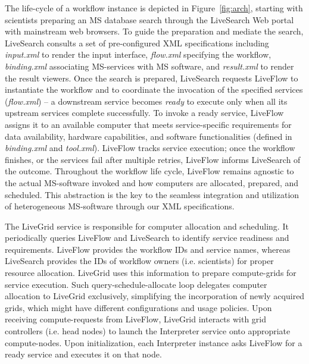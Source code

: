 \documentclass[arial,11pt]{article}
\newcommand{\SF}[1]{\textsf{#1}}
\newcommand{\LiveSearch}[0]{\SF{LiveSearch}\xspace}
\newcommand{\LiveFlow}[0]{\SF{LiveFlow}\xspace}
\newcommand{\LiveGrid}[0]{\SF{LiveGrid}\xspace}
\newcommand{\Interpreter}[0]{\SF{Interpreter}\xspace}
\begin{document}
The life-cycle of a workflow instance is depicted in Figure~\ref{fig:arch}, starting with scientists preparing an MS database search through the \LiveSearch Web portal with mainstream web browsers.
To guide the preparation and mediate the search, \LiveSearch consults a set of pre-configured XML specifications including
  {\em  input.xml} to render the input interface,
  {\em  flow.xml} specifying the workflow,
  {\em  binding.xml} associating MS-services with MS software, and
  {\em  result.xml} to render the result viewers.
%
Once the search is prepared, \LiveSearch requests \LiveFlow to instantiate the workflow and to coordinate the invocation of the specified services ({\em  flow.xml}) --
  a downstream service becomes {\em  ready} to execute only when all its upstream services complete successfully.
To invoke a ready service, \LiveFlow assigns it to an available computer that meets service-specific requirements for data availability, hardware capabilities, and software functionalities (defined in {\em  binding.xml} and {\em  tool.xml}). \LiveFlow tracks service execution; once the workflow finishes, or the services fail after multiple retries, \LiveFlow informs \LiveSearch of the outcome. Throughout the workflow life cycle, \LiveFlow remains agnostic to the actual MS-software invoked and how computers are allocated, prepared, and scheduled. This abstraction is the key to the seamless integration and utilization of heterogeneous MS-software through our XML specifications.

The \LiveGrid service is responsible for computer allocation and scheduling. It periodically queries \LiveFlow and \LiveSearch to identify service readiness and requirements. \LiveFlow provides the workflow IDs and service names, whereas \LiveSearch provides the IDs of workflow owners (i.e. scientists) for proper resource allocation.
\LiveGrid uses this information to prepare compute-grids for service execution.
Such query-schedule-allocate loop delegates computer allocation to \LiveGrid exclusively, simplifying the incorporation of newly acquired grids, which might have different configurations and usage policies.
Upon receiving compute-requests from \LiveFlow, \LiveGrid interacts with grid controllers (i.e. head nodes) to launch the \Interpreter service onto appropriate compute-nodes.
Upon initialization, each \Interpreter instance asks \LiveFlow for a ready service and executes it on that node.
\end{document}
